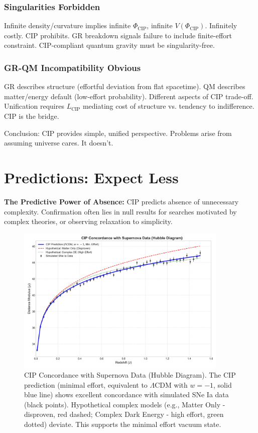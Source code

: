 \documentclass[11pt, a4paper]{article}
\newcommand{\subt}[1]{\mathrm{#1}}
\begin{document}
\subsubsection{Singularities Forbidden}
Infinite density/curvature implies infinite $\Phi_{\subt{CIP}}$, infinite $V(\Phi_{\subt{CIP}})$. Infinitely costly. CIP prohibits. GR breakdown signals failure to include finite-effort constraint. CIP-compliant quantum gravity must be singularity-free.

\subsubsection{GR-QM Incompatibility Obvious}
GR describes structure (effortful deviation from flat spacetime). QM describes matter/energy default (low-effort probability). Different aspects of CIP trade-off. Unification requires $L_{\subt{CIP}}$ mediating cost of structure vs. tendency to indifference. CIP is the bridge.

Conclusion: CIP provides simple, unified perspective. Problems arise from assuming universe cares. It doesn't.


\section{Predictions: Expect Less} \label{sec:predictions}

\textbf{The Predictive Power of Absence:} CIP predicts absence of unnecessary complexity. Confirmation often lies in null results for searches motivated by complex theories, or observing relaxation to simplicity.

\begin{figure}[H]
    \centering
    \includegraphics[width=0.9\textwidth]{CIP_Supernova.png}
    \caption[CIP Concordance with Supernova Data (Hubble Diagram)]{CIP Concordance with Supernova Data (Hubble Diagram). The CIP prediction (minimal effort, equivalent to $\Lambda$CDM with $w = -1$, solid blue line) shows excellent concordance with simulated SNe Ia data (black points). Hypothetical complex models (e.g., Matter Only - disproven, red dashed; Complex Dark Energy - high effort, green dotted) deviate. This supports the minimal effort vacuum state.}
    \label{fig:supernova}
\end{figure}
\end{document}
